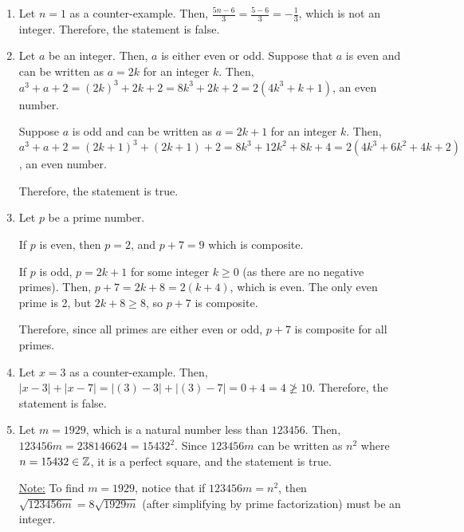 \begin{enumerate}
  \item \begin{prf}
          Let $n=1$ as a counter-example.
          Then, $\frac{5n-6}{3}=\frac{5-6}{3}=-\frac{1}{3}$, which is not an integer.
          Therefore, the statement is false.
        \end{prf}

  \item \begin{prf}
          Let $a$ be an integer. Then, $a$ is either even or odd.
          Suppose that $a$ is even and can be written as $a=2k$ for an integer $k$.
          Then, $a^3+a+2=(2k)^3+2k+2=8k^3+2k+2=2(4k^3+k+1)$, an even number.

          Suppose $a$ is odd and can be written as $a=2k+1$ for an integer $k$.
          Then, $a^3+a+2 = (2k+1)^3 + (2k+1) + 2 = 8k^3 + 12k^2 + 8k + 4 = 2(4k^3 + 6k^2 + 4k + 2)$, an even number.

          Therefore, the statement is true.
        \end{prf}

  \item \begin{prf}
          Let $p$ be a prime number.

          If $p$ is even, then $p = 2$, and $p + 7 = 9$ which is composite.

          If $p$ is odd, $p = 2k + 1$ for some integer $k \geq 0$ (as there are no negative primes).
          Then, $p + 7 = 2k + 8 = 2(k + 4)$, which is even.
          The only even prime is 2, but $2k + 8 \geq 8$, so $p + 7$ is composite.

          Therefore, since all primes are either even or odd, $p + 7$ is composite for all primes.
        \end{prf}

  \item \begin{prf}
          Let $x=3$ as a counter-example.
          Then, $|x-3|+|x-7|=|(3)-3|+|(3)-7|=0+4=4 \not\geq 10$.
          Therefore, the statement is false.
        \end{prf}

  \item \begin{prf}
          Let $m=1929$, which is a natural number less than $123456$.
          Then, $123456m=238146624=15432^2$.
          Since $123456m$ can be written as $n^2$ where $n=15432\in\mathbb{Z}$, it is a perfect square, and the statement is true.
        \end{prf}
        \underline{Note:} To find $m = 1929$, notice that if $123456m = n^2$,
        then $\sqrt{123456m} = 8\sqrt{1929m}$ (after simplifying by prime factorization)
        must be an integer.


\end{enumerate}
